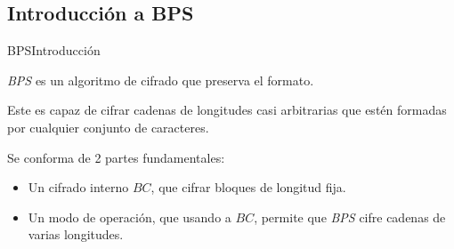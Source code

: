 %
%

\subsection{Introducción a BPS}

\begin{frame}{BPS}{Introducción}

  \textit{BPS} es un algoritmo de cifrado que preserva el formato.

  Este es capaz de cifrar cadenas de longitudes casi arbitrarias que estén
  formadas por cualquier conjunto de caracteres.

  Se conforma de 2 partes fundamentales:

  \begin{itemize}
    \item Un cifrado interno $BC$, que cifrar bloques de longitud fija.
    \item Un modo de operación, que usando a $BC$, permite que \textit{BPS}
    cifre cadenas de varias longitudes.
  \end{itemize}

\end{frame}

